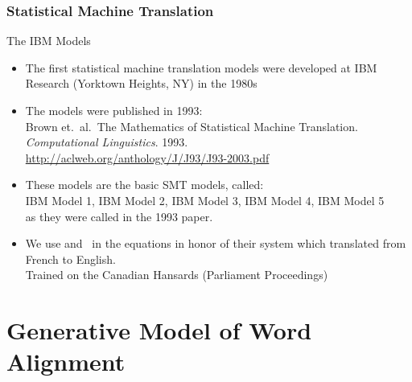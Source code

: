 \begin{frame}
\frametitle{Statistical Machine Translation}
\begin{block}{The IBM Models}
\begin{itemize}[<+->]
\item The first statistical machine translation models were developed at IBM Research (Yorktown Heights, NY) in the 1980s
\item The models were published in 1993: \\
{\small Brown et.\ al.\ The Mathematics of Statistical Machine Translation. \textit{Computational Linguistics}. 1993.} \\
{\small \url{http://aclweb.org/anthology/J/J93/J93-2003.pdf}}
\item These models are the basic SMT models, called: \\
IBM Model 1, IBM Model 2, IBM Model 3, IBM Model 4, IBM Model 5 \\
as they were called in the 1993 paper.
\item We use \tgt and \src\ in the equations in honor of their system which translated from French to English.\\
Trained on the Canadian Hansards (Parliament Proceedings)
\end{itemize}
\end{block}
\end{frame}

\section{Generative Model of Word Alignment}
\frame{\tableofcontents[currentsection]}

